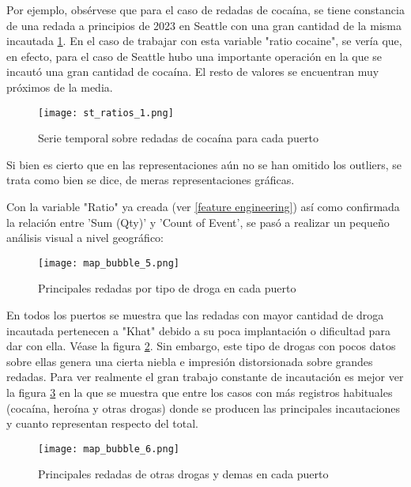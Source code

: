 \documentclass[12pt]{article}
\begin{document}
		Por ejemplo, obsérvese que para el caso de redadas de cocaína, se tiene constancia de una redada a principios de 2023 en Seattle con una gran cantidad de la misma incautada \ref{st_ratio_1}. En el caso de trabajar con esta variable "ratio cocaine", se vería que, en efecto, para el caso de Seattle hubo una importante operación en la que se incautó una gran cantidad de cocaína. El resto de valores se encuentran muy próximos de la media.
		
		\begin{figure}[H]
			\caption{\label{st_ratio_1} Serie temporal sobre redadas de cocaína para cada puerto}
			\centering
			\hspace*{1cm}
			\texttt{[image: st\_ratios\_1.png]}
		\end{figure}
		
		
		Si bien es cierto que en las representaciones aún no se han omitido los outliers, se trata como bien se dice, de meras representaciones gráficas. 
		
		Con la variable "Ratio" ya creada (ver \ref{feature engineering}) así como confirmada la relación entre 'Sum (Qty)' y 'Count of Event', se pasó a realizar un pequeño análisis visual a nivel geográfico:
		
		\begin{figure}[H]
			\caption{\label{map_bubble_5} Principales redadas por tipo de droga en cada puerto}
			\centering
			\hspace*{1cm}
			\texttt{[image: map\_bubble\_5.png]}
		\end{figure}
		
		En todos los puertos se muestra que las redadas con mayor cantidad de droga incautada pertenecen a "Khat" debido a su poca implantación o dificultad para dar con ella. Véase la figura \ref{map_bubble_5}. Sin embargo, este tipo de drogas con pocos datos sobre ellas genera una cierta niebla e impresión distorsionada sobre grandes redadas. Para ver realmente el gran trabajo constante de incautación es mejor ver la figura \ref{map_bubble_6} en la que se muestra que entre los casos con más registros habituales (cocaína, heroína y otras drogas) donde se producen las principales incautaciones y cuanto representan respecto del total.
		
		\begin{figure}[H]
			\caption{\label{map_bubble_6} Principales redadas de otras drogas y demas en cada puerto}
			\centering
			\hspace*{1cm}
			\texttt{[image: map\_bubble\_6.png]}
		\end{figure}
		
\end{document}
